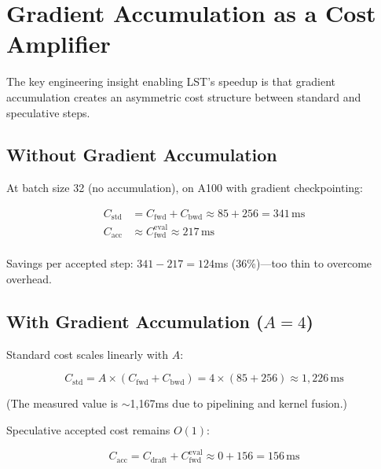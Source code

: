 \documentclass[conference]{IEEEtran}
\begin{document}
\section{Gradient Accumulation as a Cost Amplifier}
\label{sec:grad_accum}

The key engineering insight enabling LST's speedup is that gradient accumulation creates an asymmetric cost structure between standard and speculative steps.

\subsection{Without Gradient Accumulation}

At batch size 32 (no accumulation), on A100 with gradient checkpointing:

\begin{equation}
\begin{aligned}
C_{\mathrm{std}} &= C_{\mathrm{fwd}} + C_{\mathrm{bwd}} \approx 85 + 256 = 341\,\text{ms} \\
C_{\mathrm{acc}} &\approx C_{\mathrm{fwd}}^{\mathrm{eval}} \approx 217\,\text{ms} \\
\end{aligned}
\end{equation}

Savings per accepted step: $341 - 217 = 124$ms (36\%)---too thin to overcome overhead.

\subsection{With Gradient Accumulation ($A = 4$)}

Standard cost scales linearly with $A$:

\begin{equation}
C_{\mathrm{std}} = A \times (C_{\mathrm{fwd}} + C_{\mathrm{bwd}}) = 4 \times (85 + 256) \approx 1{,}226\,\text{ms}
\end{equation}

(The measured value is $\sim$1{,}167ms due to pipelining and kernel fusion.)

Speculative accepted cost remains $O(1)$:

\begin{equation}
C_{\mathrm{acc}} = C_{\mathrm{draft}} + C_{\mathrm{fwd}}^{\mathrm{eval}} \approx 0 + 156 = 156\,\text{ms}
\end{equation}
\end{document}
